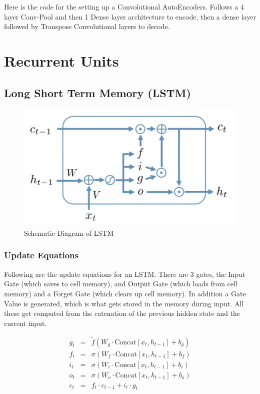 Here is the code for the setting up a Convolutional AutoEncoders. Follows a 4 layer Conv-Pool and then 1 Dense layer architecture to encode, then a dense layer followed by Transpose Convolutional layers to decode.





\section{Recurrent Units}


\subsection{Long Short Term Memory (LSTM)}

\begin{figure}[H]
	\centering
	\includegraphics[width=0.9\linewidth]{img/aml/lstm-schematic.png}
	\caption{Schematic Diagram of LSTM}
	\label{fig:lstm-schmatic}
\end{figure}

\subsubsection{Update Equations}

Following are the update equations for an LSTM. There are 3 gates, the Input Gate (which saves to cell memory), and Output Gate (which loads from cell memory) and a Forget Gate (which clears up cell memory). In addition a Gate Value is generated, which is what gets stored in the memory during input. All these get computed from the catenation of the previous hidden state and the current input.

\begin{eqnarray}
	g_t &=& \tilde{f}(W_g \cdot \text{Concat}[x_t, h_{t - 1}] + b_g) \\
	f_t &=& \sigma(W_f \cdot \text{Concat}[x_t, h_{t - 1}] + b_f) \\
	i_t &=& \sigma(W_i \cdot \text{Concat}[x_t, h_{t - 1}] + b_i) \\
	o_t &=& \sigma(W_o \cdot \text{Concat}[x_t, h_{t - 1}] + b_o) \\
	c_t &=& f_t \cdot c_{t - 1} + i_t \cdot g_t \\
\end{eqnarray}

